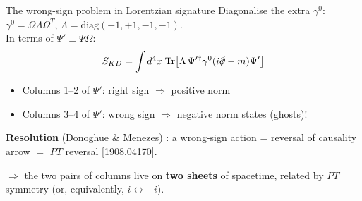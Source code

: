 \documentclass[aspectratio=169]{beamer}
\newcommand{\Red}[1]{{\color{cptred}#1}}
\newcommand{\Blue}[1]{{\color{cptblue}#1}}
\newcommand{\Green}[1]{{\color{cptgreen}#1}}
\begin{document}
\begin{frame}{The wrong-sign problem in Lorentzian signature}
  Diagonalise the extra $\gamma^0$: $\gamma^0 = \Omega\Lambda\Omega^T$,
  $\Lambda = \mathrm{diag}(+1,+1,-1,-1)$.\\[0.5em]
  In terms of $\Psi' \equiv \Psi\Omega$:
  \[
    S_{KD} = \int d^4x\;\mathrm{Tr}\!\left[\Lambda\,\Psi'{}^\dagger\gamma^0
             (i\slashed\partial - m)\Psi'\right]
  \]
  \begin{itemize}
    \item Columns 1--2 of $\Psi'$: \Green{right sign} $\Rightarrow$ positive norm
    \item Columns 3--4 of $\Psi'$: \Red{wrong sign} $\Rightarrow$ \Red{negative norm states (ghosts)!}
  \end{itemize}

  \vspace{0.5em}
  \textbf{Resolution} (Donoghue \& Menezes) : a wrong-sign action = reversal of causality arrow
  $=$ \Blue{$PT$ reversal} \small [1908.04170].

  \vspace{0.4em}
  $\Rightarrow$ the two pairs of columns live on \textbf{two sheets} of spacetime, related by $PT$ symmetry
  (or, equivalently, $i \leftrightarrow -i$).
\end{frame}

\end{document}
